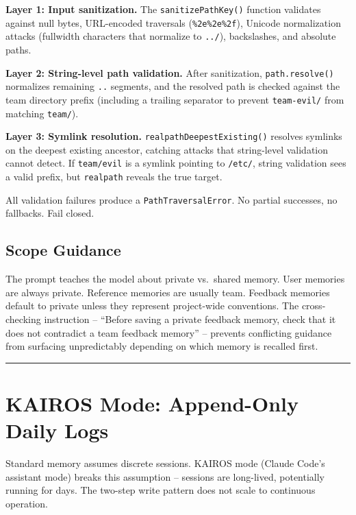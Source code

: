 \documentclass[
  english,
  11pt,
  letterpaper,
]{book}
\begin{document}
\textbf{Layer 1: Input sanitization.} The \texttt{sanitizePathKey()}
function validates against null bytes, URL-encoded traversals
(\texttt{\%2e\%2e\%2f}), Unicode normalization attacks (fullwidth
characters that normalize to \texttt{../}), backslashes, and absolute
paths.

\textbf{Layer 2: String-level path validation.} After sanitization,
\texttt{path.resolve()} normalizes remaining \texttt{..} segments, and
the resolved path is checked against the team directory prefix
(including a trailing separator to prevent \texttt{team-evil/} from
matching \texttt{team/}).

\textbf{Layer 3: Symlink resolution.} \texttt{realpathDeepestExisting()}
resolves symlinks on the deepest existing ancestor, catching attacks
that string-level validation cannot detect. If \texttt{team/evil} is a
symlink pointing to \texttt{/etc/}, string validation sees a valid
prefix, but \texttt{realpath} reveals the true target.

All validation failures produce a \texttt{PathTraversalError}. No
partial successes, no fallbacks. Fail closed.

\subsection{Scope Guidance}\label{scope-guidance}

The prompt teaches the model about private vs.~shared memory. User
memories are always private. Reference memories are usually team.
Feedback memories default to private unless they represent project-wide
conventions. The cross-checking instruction -- ``Before saving a private
feedback memory, check that it does not contradict a team feedback
memory'' -- prevents conflicting guidance from surfacing unpredictably
depending on which memory is recalled first.

\begin{center}\rule{0.5\linewidth}{0.5pt}\end{center}

\section{KAIROS Mode: Append-Only Daily
Logs}\label{kairos-mode-append-only-daily-logs}

Standard memory assumes discrete sessions. KAIROS mode (Claude Code's
assistant mode) breaks this assumption -- sessions are long-lived,
potentially running for days. The two-step write pattern does not scale
to continuous operation.
\end{document}
